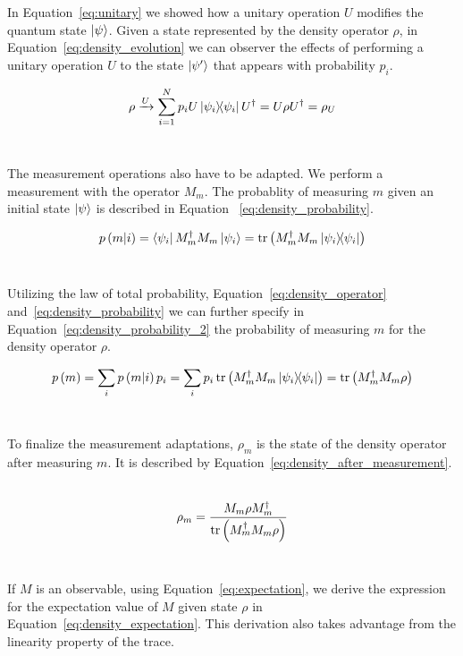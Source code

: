 In Equation~\ref{eq:unitary} we showed how a unitary operation \(U\) modifies
the quantum state \(\ket{\psi}\). Given a state represented by the density
operator \(\rho\), in Equation~\ref{eq:density_evolution} we can observer the
effects of performing a unitary operation \(U\) to the state \(\ket{\psi'}\)
that appears with probability \(p_i\). \

\begin{equation}\label{eq:density_evolution}
  \rho \xrightarrow{U} \sum_{i=1}^{N}p_{i}U\ketbra{\psi_i}{\psi_i}U^{\dag} =
  U\rho U^{\dag} = \rho_{U}
\end{equation} \

The measurement operations also have to be adapted. We perform a
measurement with the operator \(M_m\). The probablity of measuring
\(m\) given an initial state \(\ket{\psi}\) is described in Equation
~\ref{eq:density_probability}. \

\begin{equation}\label{eq:density_probability}
  p\left(m|i\right) = \bra{\psi_i}M_{m}^{\dag}M_{m}\ket{\psi_i} =
  \trace\left(M_{m}^{\dag}M_{m}\ketbra{\psi_i}{\psi_i}\right)
\end{equation} \

Utilizing the law of total probability, Equation~\ref{eq:density_operator}
and~\ref{eq:density_probability} we can further specify in 
Equation~\ref{eq:density_probability_2} the probability of measuring
\(m\) for the density operator \(\rho\). \

\begin{equation}\label{eq:density_probability_2}
  p\left(m\right) = \sum_{i}p\left(m|i\right)p_{i} =
  \sum_{i}p_{i}\trace\left(M_{m}^{\dag}M_{m}\ketbra{\psi_i}{\psi_i}\right) =
  \trace\left(M_{m}^{\dag}M_{m}\rho \right)
\end{equation} \

To finalize the measurement adaptations, \(\rho_m\) is the state of
the density operator after measuring \(m\). It is described by
Equation~\ref{eq:density_after_measurement}. \

\begin{equation}\label{eq:density_after_measurement}
  \rho_m = 
  \frac{M_{m}\rho M_{m}^{\dag}}{\trace\left(M_{m}^{\dag}M_{m}\rho\right)}
\end{equation} \

If \(M\) is an observable, using Equation~\ref{eq:expectation}, we derive
the expression for the expectation value of \(M\) given state \(\rho\)
in Equation~\ref{eq:density_expectation}. This derivation also takes 
advantage from the linearity property of the trace. \

